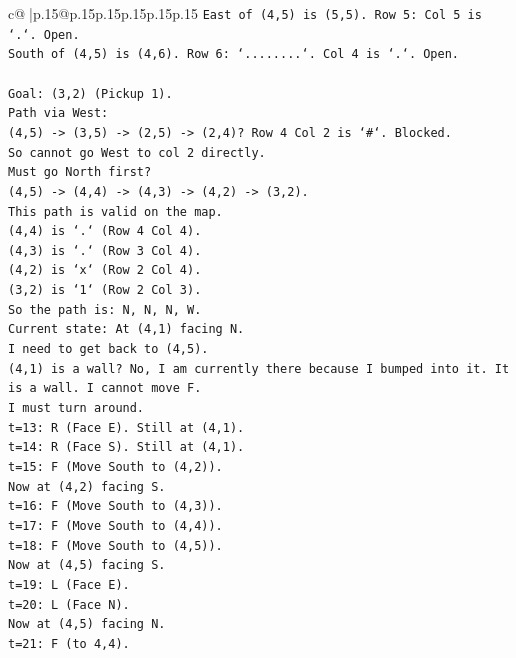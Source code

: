 \documentclass{article}
\begin{document}
{\begin{supertabular}{c@{$\;$}|p{.15\linewidth}@{}p{.15\linewidth}p{.15\linewidth}p{.15\linewidth}p{.15\linewidth}p{.15\linewidth}}
{{{\texttt{East of (4,5) is (5,5). Row 5: Col 5 is `.`. Open.} \\
\texttt{South of (4,5) is (4,6). Row 6: `........`. Col 4 is `.`. Open.} \\
\\ 
\texttt{Goal: (3,2) (Pickup 1).} \\
\texttt{Path via West:} \\
\texttt{(4,5) {-}> (3,5) {-}> (2,5) {-}> (2,4)? Row 4 Col 2 is `\#`. Blocked.} \\
\texttt{So cannot go West to col 2 directly.} \\
\texttt{Must go North first?} \\
\texttt{(4,5) {-}> (4,4) {-}> (4,3) {-}> (4,2) {-}> (3,2).} \\
\texttt{This path is valid on the map.} \\
\texttt{(4,4) is `.` (Row 4 Col 4).} \\
\texttt{(4,3) is `.` (Row 3 Col 4).} \\
\texttt{(4,2) is `x` (Row 2 Col 4).} \\
\texttt{(3,2) is `1` (Row 2 Col 3).} \\
\texttt{So the path is: N, N, N, W.} \\
\texttt{Current state: At (4,1) facing N.} \\
\texttt{I need to get back to (4,5).} \\
\texttt{(4,1) is a wall? No, I am currently there because I bumped into it. It is a wall. I cannot move F.} \\
\texttt{I must turn around.} \\
\texttt{t=13: R (Face E). Still at (4,1).} \\
\texttt{t=14: R (Face S). Still at (4,1).} \\
\texttt{t=15: F (Move South to (4,2)).} \\
\texttt{Now at (4,2) facing S.} \\
\texttt{t=16: F (Move South to (4,3)).} \\
\texttt{t=17: F (Move South to (4,4)).} \\
\texttt{t=18: F (Move South to (4,5)).} \\
\texttt{Now at (4,5) facing S.} \\
\texttt{t=19: L (Face E).} \\
\texttt{t=20: L (Face N).} \\
\texttt{Now at (4,5) facing N.} \\
\texttt{t=21: F (to 4,4).} \\
}}}
\end{supertabular}}
\end{document}
